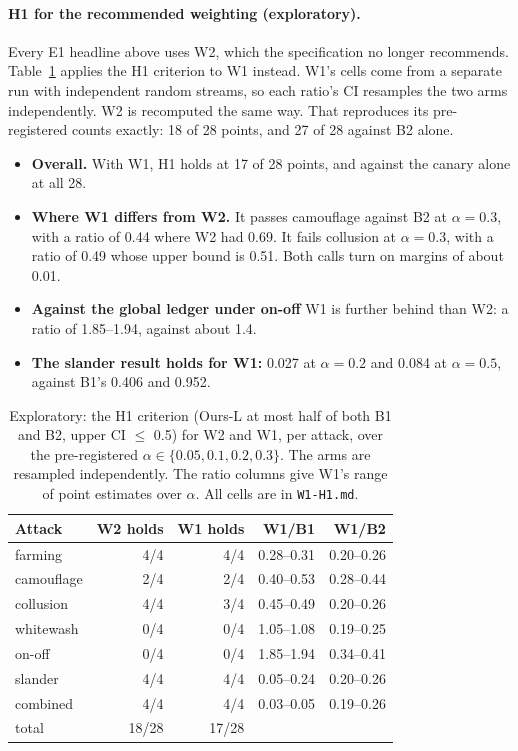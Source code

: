 \paragraph{H1 for the recommended weighting (exploratory).}
Every E1 headline above uses W2, which the specification no longer
recommends. Table~\ref{tab:w1h1} applies the H1 criterion to W1 instead.
W1's cells come from a separate run with independent random streams, so
each ratio's CI resamples the two arms independently. W2 is recomputed
the same way. That reproduces its pre-registered counts exactly: 18 of
28 points, and 27 of 28 against B2 alone.
\begin{itemize}
\item \textbf{Overall.} With W1, H1 holds at 17 of 28 points, and
  against the canary alone at all 28.
\item \textbf{Where W1 differs from W2.} It passes camouflage against B2
  at $\alpha{=}0.3$, with a ratio of 0.44 where W2 had 0.69. It fails
  collusion at $\alpha{=}0.3$, with a ratio of 0.49 whose upper bound is
  0.51. Both calls turn on margins of about 0.01.
\item \textbf{Against the global ledger under on-off} W1 is further
  behind than W2: a ratio of 1.85--1.94, against about 1.4.
\item \textbf{The slander result holds for W1:} 0.027 at $\alpha{=}0.2$
  and 0.084 at $\alpha{=}0.5$, against B1's 0.406 and 0.952.
\end{itemize}

\begin{table}[t]
\caption{Exploratory: the H1 criterion (Ours-L at most half of both B1
and B2, upper CI $\le$ 0.5) for W2 and W1, per attack, over the
pre-registered $\alpha\in\{0.05,0.1,0.2,0.3\}$. The arms are resampled
independently. The ratio columns give W1's range of point estimates over
$\alpha$. All cells are in \texttt{W1-H1.md}.}
\label{tab:w1h1}
\small
\begin{tabular}{@{}lrrrr@{}}
\toprule
Attack & W2 holds & W1 holds & W1/B1 & W1/B2 \\
\midrule
farming & 4/4 & 4/4 & 0.28--0.31 & 0.20--0.26 \\
camouflage & 2/4 & 2/4 & 0.40--0.53 & 0.28--0.44 \\
collusion & 4/4 & 3/4 & 0.45--0.49 & 0.20--0.26 \\
whitewash & 0/4 & 0/4 & 1.05--1.08 & 0.19--0.25 \\
on-off & 0/4 & 0/4 & 1.85--1.94 & 0.34--0.41 \\
slander & 4/4 & 4/4 & 0.05--0.24 & 0.20--0.26 \\
combined & 4/4 & 4/4 & 0.03--0.05 & 0.19--0.26 \\
\midrule
total & 18/28 & 17/28 & & \\
\bottomrule
\end{tabular}
\end{table}


